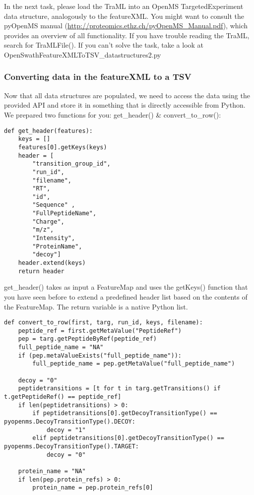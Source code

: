 {In the next task, please load the TraML into an OpenMS TargetedExperiment data structure, analogously to the featureXML. You might want to consult the pyOpenMS manual (\url{http://proteomics.ethz.ch/pyOpenMS_Manual.pdf}), which provides an overview of all functionality. If you have trouble reading the TraML, search for TraMLFile(). If you can't solve the task, take a look at OpenSwathFeatureXMLToTSV\_datastructures2.py

\subsubsection{Converting data in the featureXML to a TSV}
Now that all data structures are populated, we need to access the data using the provided API and store it in something that is directly accessible from Python. We prepared two functions for you: get\_header() \& convert\_to\_row():

\begin{lstlisting}
def get_header(features):
    keys = []
    features[0].getKeys(keys)
    header = [
        "transition_group_id",
        "run_id",
        "filename",
        "RT",
        "id",
        "Sequence" ,
        "FullPeptideName",
        "Charge",
        "m/z",
        "Intensity",
        "ProteinName",
        "decoy"]
    header.extend(keys)
    return header
\end{lstlisting}

get\_header() takes as input a FeatureMap and uses the getKeys() function that you have seen before to extend a predefined header list based on the contents of the FeatureMap. The return variable is a native Python list.

\begin{lstlisting}
def convert_to_row(first, targ, run_id, keys, filename):
    peptide_ref = first.getMetaValue("PeptideRef")
    pep = targ.getPeptideByRef(peptide_ref)
    full_peptide_name = "NA"
    if (pep.metaValueExists("full_peptide_name")):
        full_peptide_name = pep.getMetaValue("full_peptide_name")

    decoy = "0"
    peptidetransitions = [t for t in targ.getTransitions() if t.getPeptideRef() == peptide_ref]
    if len(peptidetransitions) > 0:
        if peptidetransitions[0].getDecoyTransitionType() == pyopenms.DecoyTransitionType().DECOY:
            decoy = "1"
        elif peptidetransitions[0].getDecoyTransitionType() == pyopenms.DecoyTransitionType().TARGET:
            decoy = "0"

    protein_name = "NA"
    if len(pep.protein_refs) > 0:
        protein_name = pep.protein_refs[0]


\end{lstlisting}}
